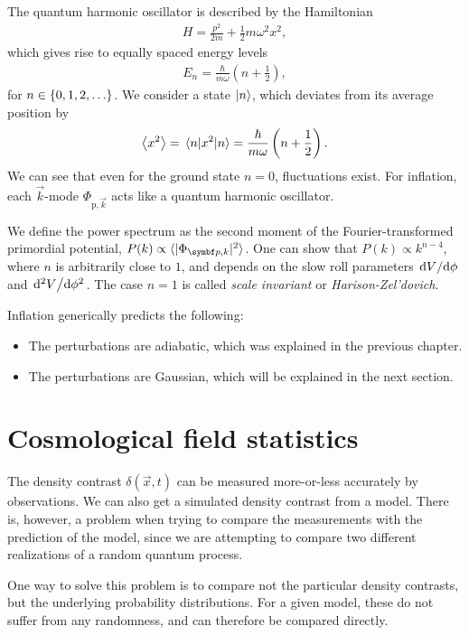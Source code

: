The quantum harmonic oscillator is described by the Hamiltonian
\begin{align*}
	H = \frac{p^2}{2m} + \frac{1}{2} m \omega^2 x^2,
\end{align*}
which gives rise to equally spaced energy levels
\begin{align*}
	E_n = \frac{\hbar}{m \omega}
	\left( n + \frac{1}{2} \right),
\end{align*}
for $n \in \left\{ {0, 1, 2, \dots} \right\}$. We consider a state $\ket{n}$, which deviates from its average position by
\begin{align*}
	\expval{x^2} = \expval{x^2}{n}
	= \frac{\hbar}{m\omega}
	\left( n + \frac{1}{2} \right).
\end{align*}
We can see that even for the ground state $n=0$, fluctuations exist. For inflation, each $\vec{k}$-mode $\Phi_{\text{p},\vec{k}}$ acts like a quantum harmonic oscillator.

We define the power spectrum as the second moment of the Fourier-transformed primordial potential, $P(k) \propto \langle{\abs{\Phi_{\vec{p},k}}^2}\rangle$. One can show that $P(k) \propto k^{n-4}$, where $n$ is arbitrarily close to $1$, and depends on the slow roll parameters $\dv*{V}{\phi}$ and $\dv*[2]{V}{\phi}$. The case $n=1$ is called \emph{scale invariant} or \emph{Harison-Zel'dovich}.

Inflation generically predicts the following:
\begin{itemize}
	\item The perturbations are adiabatic, which was explained in the previous chapter.
	\item The perturbations are Gaussian, which will be explained in the next section.
\end{itemize}




\section{Cosmological field statistics}
The density contrast $\delta(\vec{x}, t)$ can be measured more-or-less accurately by observations. We can also get a simulated density contrast from a model. There is, however, a problem when trying to compare the measurements with the prediction of the model, since we are attempting to compare two different realizations of a random quantum process. 

One way to solve this problem is to compare not the particular density contrasts, but the underlying probability distributions. For a given model, these do not suffer from any randomness, and can therefore be compared directly.

